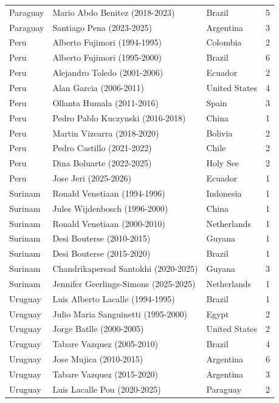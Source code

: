 \documentclass[11pt,a4paper]{article}
\begin{document}
\begin{longtable}{lllr}
  Paraguay & Mario Abdo Benitez (2018-2023) & Brazil &   5 \\ 
  Paraguay & Santiago Pena (2023-2025) & Argentina &   3 \\ 
  Peru & Alberto Fujimori (1994-1995) & Colombia &   2 \\ 
  Peru & Alberto Fujimori (1995-2000) & Brazil &   6 \\ 
  Peru & Alejandro Toledo (2001-2006) & Ecuador &   2 \\ 
  Peru & Alan Garcia (2006-2011) & United States &   4 \\ 
  Peru & Ollanta Humala (2011-2016) & Spain &   3 \\ 
  Peru & Pedro Pablo Kuczynski (2016-2018) & China &   1 \\ 
  Peru & Martin Vizcarra (2018-2020) & Bolivia &   2 \\ 
  Peru & Pedro Castillo (2021-2022) & Chile &   2 \\ 
  Peru & Dina Boluarte (2022-2025) & Holy See &   2 \\ 
  Peru & Jose Jeri (2025-2026) & Ecuador &   1 \\ 
  Surinam & Ronald Venetiaan (1994-1996) & Indonesia &   1 \\ 
  Surinam & Jules Wijdenbosch (1996-2000) & China &   1 \\ 
  Surinam & Ronald Venetiaan (2000-2010) & Netherlands &   1 \\ 
  Surinam & Desi Bouterse (2010-2015) & Guyana &   1 \\ 
  Surinam & Desi Bouterse (2015-2020) & Brazil &   1 \\ 
  Surinam & Chandrikapersad Santokhi (2020-2025) & Guyana &   3 \\ 
  Surinam & Jennifer Geerlings-Simons (2025-2025) & Netherlands &   1 \\ 
  Uruguay & Luis Alberto Lacalle (1994-1995) & Brazil &   1 \\ 
  Uruguay & Julio Maria Sanguinetti (1995-2000) & Egypt &   2 \\ 
  Uruguay & Jorge Batlle (2000-2005) & United States &   2 \\ 
  Uruguay & Tabare Vazquez (2005-2010) & Brazil &   4 \\ 
  Uruguay & Jose Mujica (2010-2015) & Argentina &   6 \\ 
  Uruguay & Tabare Vazquez (2015-2020) & Argentina &   3 \\ 
  Uruguay & Luis Lacalle Pou (2020-2025) & Paraguay &   2 \\ 

\end{longtable}
\end{document}
